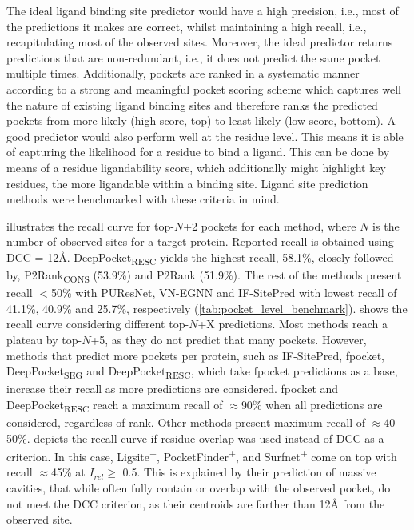 The ideal ligand binding site predictor would have a high precision, i.e., most of the predictions it makes are correct, whilst maintaining a high recall, i.e., recapitulating most of the observed sites. Moreover, the ideal predictor returns predictions that are non-redundant, i.e., it does not predict the same pocket multiple times. Additionally, pockets are ranked in a systematic manner according to a strong and meaningful pocket scoring scheme which captures well the nature of existing ligand binding sites and therefore ranks the predicted pockets from more likely (high score, top) to least likely (low score, bottom). A good predictor would also perform well at the residue level. This means it is able of capturing the likelihood for a residue to bind a ligand. This can be done by means of a residue ligandability score, which additionally might highlight key residues, the more ligandable within a binding site. Ligand site prediction methods were benchmarked with these criteria in mind.

 illustrates the recall curve for top-$N$+2 pockets for each method, where $N$ is the number of observed sites for a target protein. Reported recall is obtained using DCC = 12\AA{}. DeepPocket\textsubscript{RESC} yields the highest recall, 58.1\%, closely followed by, P2Rank\textsubscript{CONS} (53.9\%) and P2Rank (51.9\%). The rest of the methods present recall $<$50\% with PUResNet, VN-EGNN and IF-SitePred with lowest recall of 41.1\%, 40.9\% and 25.7\%, respectively (\autoref{tab:pocket_level_benchmark}).  shows the recall curve considering different top-$N$+X predictions. Most methods reach a plateau by top-$N$+5, as they do not predict that many pockets. However, methods that predict more pockets per protein, such as IF-SitePred, fpocket, DeepPocket\textsubscript{SEG} and DeepPocket\textsubscript{RESC}, which take fpocket predictions as a base, increase their recall as more predictions are considered. fpocket and DeepPocket\textsubscript{RESC} reach a maximum recall of $\approx$90\% when all predictions are considered, regardless of rank. Other methods present maximum recall of $\approx$40-50\%.  depicts the recall curve if residue overlap was used instead of DCC as a criterion. In this case, Ligsite\textsuperscript{+}, PocketFinder\textsuperscript{+}, and Surfnet\textsuperscript{+} come on top with recall $\approx$45\% at $I_{rel} \geq$ 0.5. This is explained by their prediction of massive cavities, that while often fully contain or overlap with the observed pocket, do not meet the DCC criterion, as their centroids are farther than 12\AA{} from the observed site.


